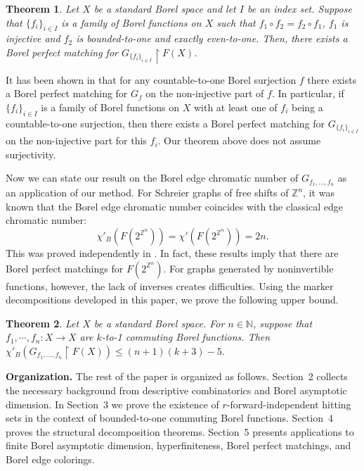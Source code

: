 \documentclass[11pt, reqno, a4paper]{amsart}
\newtheorem{theorem}{Theorem}[section]
\theoremstyle{definition}
\theoremstyle{plain}
\begin{document}
\begin{theorem}
Let $X$ be a standard Borel space and let $I$ be an index set.
Suppose that $\{f_i\}_{i\in I}$ is a family of Borel functions on $X$ such that $f_1\circ f_2=f_2\circ f_1$, $f_1$ is injective and $f_2$ is bounded-to-one and exactly even-to-one.
Then, there exists a Borel perfect matching for $G_{\{f_i\}_{i\in I}}\upharpoonright F(X)$.
\end{theorem}

It has been shown in \cite[Proposition 2.8]{ConleyMiller2017MeasurablePerfectMatchings} that for any countable-to-one Borel surjection $f$ there exists a Borel perfect matching for $G_f$ on the non-injective part of $f$. In particular, if $\{f_i\}_{i\in I}$ is a family of Borel functions on $X$ with at least one of $f_i$ being a countable-to-one surjection, then there exists a Borel perfect matching for $G_{\{f_i\}_{i\in I}}$ on the non-injective part for this $f_i$. Our theorem above does not assume surjectivity.

Now we can state our result on the Borel edge chromatic number of $G_{f_1,\dots, f_n}$ as an application of our method. 
For Schreier graphs of
free shifts of $\mathbb Z^n$, it was known that the Borel edge chromatic number
coincides with the classical edge chromatic number:
$$
\chi'_B(F(2^{\mathbb Z^n}))=\chi'(F(2^{\mathbb Z^n}))=2n.
$$
This was proved independently in
\cite{Bencs2021FactorIID, GrebikRozhon2023LocalProblems, Weilacher2024, BorelFactorsSubshifts2025}. In fact, these results imply that there are Borel perfect matchings for $F(2^{\mathbb{Z}^n})$. 
For graphs generated by noninvertible functions, however, the lack of inverses
creates difficulties. Using the marker decompositions developed in
this paper, we prove the following upper bound.

\begin{theorem}
    Let $X$ be a standard Borel space. For $n\in\mathbb{N}$, suppose that $f_1,\cdots,f_n:X\to X$ are $k$-to-1 commuting Borel functions.
 Then $\chi'_B(G_{f_1,...,f_n}\upharpoonright F(X))\leq (n+1)(k+3)-5.$
\end{theorem}



\medskip
\noindent\textbf{Organization.}
The rest of the paper is organized as follows. Section~2 collects the necessary background
from descriptive combinatorics and Borel asymptotic dimension. In Section~3 we prove the existence of $r$-forward-independent hitting sets in the context of bounded-to-one commuting Borel functions. Section~4 proves
the structural decomposition theorems. Section~5 presents applications to
finite Borel asymptotic dimension, hyperfiniteness, Borel perfect matchings,
and Borel edge colorings.
\end{document}
